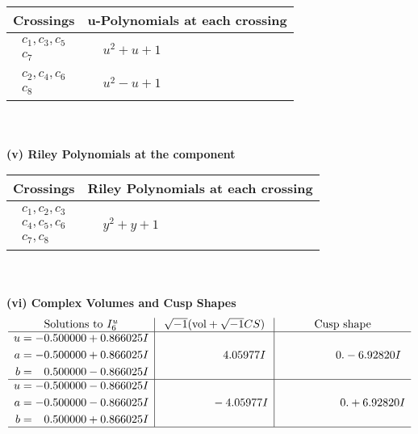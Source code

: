 \documentclass[1p]{elsarticle_modified}
\theoremstyle{definition}
\newcommand{\I}{\sqrt{-1}}
\begin{document}
\begin{tabular}{m{50pt}|m{274pt}}
Crossings & \hspace{64pt}u-Polynomials at each crossing \\
\hline $$\begin{aligned}c_{1},c_{3},c_{5}\\c_{7}\end{aligned}$$&$\begin{aligned}
&u^2+u+1
\end{aligned}$\\
\hline $$\begin{aligned}c_{2},c_{4},c_{6}\\c_{8}\end{aligned}$$&$\begin{aligned}
&u^2- u+1
\end{aligned}$\\
\hline
\end{tabular}\\~\\
\newpage\renewcommand{\arraystretch}{1}
\flushleft \textbf{(v) Riley Polynomials at the component}\newline \\
\begin{tabular}{m{50pt}|m{274pt}}
Crossings & \hspace{64pt}Riley Polynomials at each crossing \\
\hline $$\begin{aligned}c_{1},c_{2},c_{3}\\c_{4},c_{5},c_{6}\\c_{7},c_{8}\end{aligned}$$&$\begin{aligned}
&y^2+y+1
\end{aligned}$\\
\hline
\end{tabular}\\~\\
\newpage\flushleft \textbf{(vi) Complex Volumes and Cusp Shapes}
$$\begin{array}{c|c|c}  
\text{Solutions to }I^u_{6}& \I (\text{vol} + \sqrt{-1}CS) & \text{Cusp shape}\\
 \hline 
\begin{aligned}
u &= -0.500000 + 0.866025 I \\
a &= -0.500000 + 0.866025 I \\
b &= \phantom{-}0.500000 - 0.866025 I\end{aligned}
 & \phantom{-0.000000 -}4.05977 I & \phantom{-0.000000 } 0. - 6.92820 I \\ \hline\begin{aligned}
u &= -0.500000 - 0.866025 I \\
a &= -0.500000 - 0.866025 I \\
b &= \phantom{-}0.500000 + 0.866025 I\end{aligned}
 & \phantom{-0.000000 } -4.05977 I & \phantom{-0.000000 -}0. + 6.92820 I\\
 \hline 
 \end{array}$$\newpage\newpage\renewcommand{\arraystretch}{1}
\end{document}
